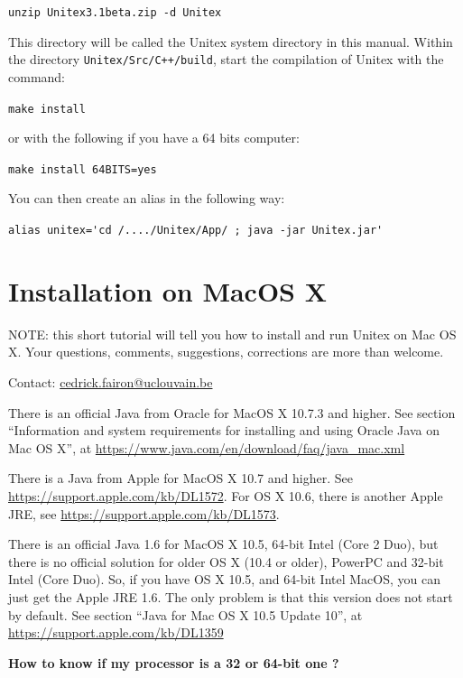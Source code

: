 \bigskip \noindent \verb$unzip Unitex3.1beta.zip -d Unitex$

\bigskip
\noindent This directory will be called the Unitex system directory in this manual.
Within the directory \verb|Unitex/Src/C++/build|, start the compilation
of Unitex with the command:

\bigskip \verb+make install+

\bigskip
\noindent or with the following if you have a 64 bits computer:
 
\bigskip \verb+make install 64BITS=yes+

\bigskip
\noindent You can then create an alias in the following way:

\bigskip \verb$alias unitex='cd /..../Unitex/App/ ; java -jar Unitex.jar'$


\section{Installation on MacOS X}
\label{section-macos-install}
\noindent NOTE: this short tutorial will tell you how to install and run 
Unitex on Mac OS X. Your questions, comments, suggestions, 
corrections are more than welcome. 

\noindent Contact: \url{cedrick.fairon@uclouvain.be}


\bigskip
\noindent There is an official Java from Oracle for MacOS X 10.7.3 and higher.
	See section ``Information and system requirements for installing and using Oracle Java on Mac OS X'', at \url{https://www.java.com/en/download/faq/java_mac.xml}



\bigskip
\noindent There is a Java from Apple for MacOS X 10.7 and higher.
	See \url{https://support.apple.com/kb/DL1572}. For OS X 10.6, there is another Apple JRE, see \url{https://support.apple.com/kb/DL1573}.

	
	
\bigskip
\noindent There is an official Java 1.6 for MacOS X 10.5, 64-bit Intel 
(Core 2 Duo), but there is no official solution for older OS X (10.4 or older),
PowerPC and 32-bit Intel (Core Duo). So,
 if you have OS X 10.5, and 64-bit Intel MacOS, you can just get the
    Apple JRE 1.6. The only problem is that this version does not start by
    default. See section ``Java for Mac OS X 10.5 Update 10'', 
    at \url{https://support.apple.com/kb/DL1359}

\noindent\textbf{How to know if my processor is a 32 or 64-bit one ?}

